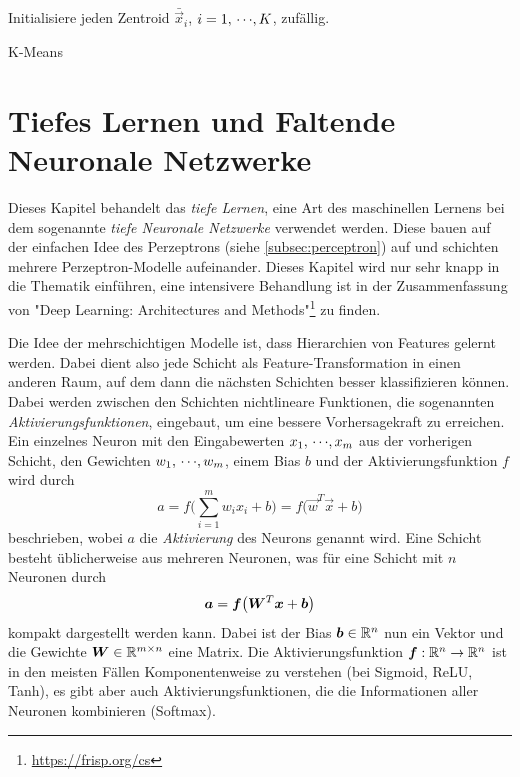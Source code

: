 		\begin{algorithm}  \DontPrintSemicolon
			Initialisiere jeden Zentroid \( \bar{\vec{x}}_i \), \( i = 1,\,\cdots\!,K \), \bspw zufällig. \;
			\caption{K-Means}
			\label{alg:kMean}
		\end{algorithm}

\chapter{Tiefes Lernen und Faltende Neuronale Netzwerke}
	\label{c:deepLearning}

	Dieses Kapitel behandelt das \emph{tiefe Lernen}, eine Art des maschinellen Lernens bei dem sogenannte \emph{tiefe Neuronale Netzwerke} verwendet werden. Diese bauen auf der einfachen Idee des Perzeptrons (siehe \autoref{subsec:perceptron}) auf und schichten mehrere Perzeptron-Modelle aufeinander. Dieses Kapitel wird nur sehr knapp in die Thematik einführen, eine intensivere Behandlung ist in der Zusammenfassung von "Deep Learning: Architectures and Methods"\footnote{\url{https://frisp.org/cs}} zu finden.

	Die Idee der mehrschichtigen Modelle ist, dass Hierarchien von Features gelernt werden. Dabei dient also jede Schicht als Feature-Transformation in einen anderen Raum, auf dem dann die nächsten Schichten besser klassifizieren können. Dabei werden zwischen den Schichten nichtlineare Funktionen, die sogenannten \emph{Aktivierungsfunktionen}, eingebaut, um eine bessere Vorhersagekraft zu erreichen. Ein einzelnes Neuron mit den Eingabewerten \( x_1,\,\cdots\!,x_m \) aus der vorherigen Schicht, den Gewichten \( w_1,\,\cdots\!,w_m \), einem Bias \(b\) und der Aktivierungsfunktion \(f\) wird durch
	\begin{equation}
		a = f\Bigg(\! \sum_{i = 1}^{m} w_i x_i + b \!\Bigg) = f\big( \vec{w}^T \vec{x} + b \big)
	\end{equation}
	beschrieben, wobei \(a\) die \emph{Aktivierung} des Neurons genannt wird. Eine Schicht besteht üblicherweise aus mehreren Neuronen, was für eine Schicht mit \(n\) Neuronen durch
	\begin{equation}
		\bm{a} = \bm{f}\big( \bm{W}^T \bm{x} + \bm{b} \big)
	\end{equation}
	kompakt dargestellt werden kann. Dabei ist der Bias \( \bm{b} \in \mathbb{R}^n \) nun ein Vektor und die Gewichte \( \bm{W} \in \mathbb{R}^{m \times n} \) eine Matrix. Die Aktivierungsfunktion \(\bm{f} : \mathbb{R}^n \to \mathbb{R}^n\) ist in den meisten Fällen Komponentenweise zu verstehen (\zB bei Sigmoid, ReLU, Tanh), es gibt aber auch Aktivierungsfunktionen, die die Informationen aller Neuronen kombinieren (\zB Softmax).

